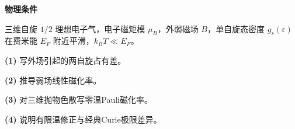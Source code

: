 \textbf{物理条件}\par 三维自旋 \(1/2\) 理想电子气，电子磁矩模 \(\mu_B\)，外弱磁场 \(B\)，单自旋态密度 \(g_s(\varepsilon)\) 在费米能 \(E_F\) 附近平滑，\(k_BT\ll E_F\)。
\par\noindent\textbf{(1)} 写外场引起的两自旋占有差。
\par\noindent\textbf{(2)} 推导弱场线性磁化率。
\par\noindent\textbf{(3)} 对三维抛物色散写零温Pauli磁化率。
\par\noindent\textbf{(4)} 说明有限温修正与经典Curie极限差异。
